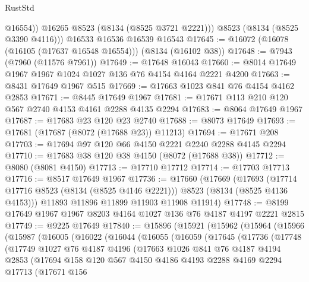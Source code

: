 \begin{lexlean}{RustStd}
\begin{coremodule}
{\begin{coremodule}
{{{{{{{{{{{{{{{{{{{{{{{{{{{{{{{{{{{{{{{{{{{{{{{{{{{{{            @16554))
        @16265
        @8523
        (@8134 (@8525 @3721 @2221)))
      @8523
      (@8134 (@8525 @3390 @4116)))
    @16533
    @16536
    @16539
    @16543
@17645 := @16072 (@16078 (@16105 (@17637 @16548 @16554))) (@8134 (@16102 @38))
@17648 := @7943 (@7960 (@11576 @7961))
@17649 := @17648 @16043
@17660 := @8014 @17649 @1967 @1967 @1024 @1027 @136 @76 @4154 @4164 @2221 @4200
@17663 := @8431 @17649 @1967 @515
@17669 := @17663 @1023 @841 @76 @4154 @4162 @2853
@17671 := @8445 @17649 @1967
@17681 := @17671 @113 @210 @120 @567 @2740 @4153 @4161 @2288 @4135 @2294
@17683 := @8064 @17649 @1967
@17687 := @17683 @23 @120 @23 @2740
@17688 := @8073 @17649
@17693 := @17681 (@17687 (@8072 (@17688 @23)) @11213)
@17694 := @17671 @208
@17703 := @17694 @97 @120 @66 @4150 @2221 @2240 @2288 @4145 @2294
@17710 := @17683 @38 @120 @38 @4150 (@8072 (@17688 @38))
@17712 := @8080 (@8081 @4150)
@17713 := @17710 @17712
@17714 := @17703 @17713
@17716 := @8517 @17649 @1967
@17736 := @17660
    (@17669
      (@17693 (@17714 @17716 @8523 (@8134 (@8525 @4146 @2221))) @8523 (@8134 (@8525 @4136 @4153)))
      @11893
      @11896
      @11899
      @11903
      @11908
      @11914)
@17748 := @8199 @17649 @1967 @1967 @8203 @4164 @1027 @136 @76 @4187 @4197 @2221 @2815
@17749 := @9225 @17649
@17840 := @15896
    (@15921
      (@15962
        (@15964
          (@15966
            (@15987
              (@16005
                (@16022
                  (@16044
                    (@16055
                      (@16059
                        (@17645
                          (@17736
                            (@17748
                              (@17749
                                @1027
                                @76
                                @4187
                                @4196
                                (@17663
                                  @1026
                                  @841
                                  @76
                                  @4187
                                  @4194
                                  @2853
                                  (@17694
                                    @158
                                    @120
                                    @567
                                    @4150
                                    @4186
                                    @4193
                                    @2288
                                    @4169
                                    @2294
                                    @17713
                                    (@17671
                                      @156
}}}}}}}}}}}}}}}}}}}}}}}}}}}}}}}}}}}}}}}}}}}}}}}}}}}}}
\end{coremodule}}
\end{coremodule}
\end{lexlean}
